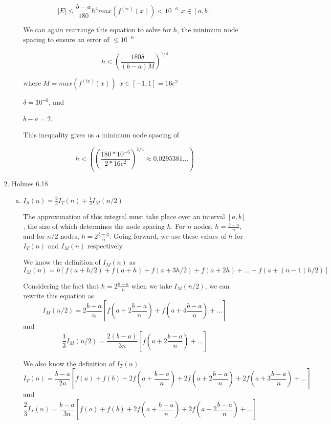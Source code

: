 \documentclass[11pt]{article}
\begin{document}
\begin{enumerate}
\begin{enumerate}
		\[
		|E| \leq \frac{b-a}{180}h^4max(f^{(iv)}(x)) < 10^{-6}\ \ x\in[a,b]
		\]

		We can again rearrange this equation to solve for $h$, the minimum node spacing to ensure an error of $\leq 10^{-6}$

		\[
		h < (\frac{180\delta}{(b-a)M})^{1/4}
		\]

		where $M=max(f^{(iv)}(x))\ \ x\in[-1,1] = 16e^2$

		$\delta = 10^{-6}$, and

		$b-a=2$.

		This inequality gives us a minimum node spacing of

		\[
		h < ((\frac{180*10^{-6}}{2*16e^2})^{1/4} \approx 0.0295381\ldots)
		\]

		\medskip

	\end{enumerate}

	\item Holmes 6.18

	\begin{enumerate}[(a)]

		\item $I_S(n) = \frac{2}{3}I_T(n) + \frac{1}{3}I_M(n/2)$

		The approximation of this integral must take place over an interval $[a,b]$, the size of which determines the node spacing $h$.
		For $n$ nodes, $h=\frac{b-a}{n}$, and for $n/2$ nodes, $h = 2\frac{b-a}{n}$. Going forward, we use these values of $h$ for $I_T(n)$ and $I_M(n)$ respectively.

		\medskip

		We know the definition of $I_M(n)$ as
		\[
		I_M(n) = h[f(a+h/2) + f(a+h) + f(a+3h/2) + f(a+2h) + \ldots + f(a+(n-1)h/2)]
		\]

		\medskip

		Considering the fact that $h=2\frac{b-a}{n}$ when we take $I_M(n/2)$, we can rewrite this equation as
		\[
		I_M(n/2) = 2\frac{b-a}{n}[f(a+2\frac{b-a}{n}) + f(a+4\frac{b-a}{n}) + \ldots]
		\]
		and
		\[
		\frac{1}{3}I_M(n/2) = \frac{2(b-a)}{3n}[f(a+2\frac{b-a}{n}) + \ldots]
		\]

		\medskip

		We also know the definition of $I_T(n)$
		\[
		I_T(n) = \frac{b-a}{2n}[f(a) + f(b) + 2f(a+\frac{b-a}{n}) + 2f(a+2\frac{b-a}{n}) + 2f(a+3\frac{b-a}{n})+\ldots]
		\]
		and
		\[
		\frac{2}{3}I_T(n) = \frac{b-a}{3n}[f(a) + f(b) + 2f(a+\frac{b-a}{n}) + 2f(a+2\frac{b-a}{n}) + \ldots]
		\]

		\medskip


\end{enumerate}
\end{enumerate}
\end{document}

